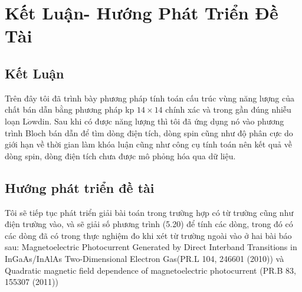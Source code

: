 \chapter{Kết Luận- Hướng Phát Triển Đề Tài}
\label{Chapter0} %
\section{Kết Luận}
Trên đây tôi đã trình bày phương pháp tính toán cấu trúc vùng năng lượng của chất bán dẫn bằng phương pháp kp $14\times14$ chính xác và trong gần đúng nhiễu loạn L$\ddot{o}$wdin.
Sau khi có được năng lượng thì tôi đã ứng dụng nó vào phương trình Bloch bán dẫn để tìm dòng điện tích, dòng spin cũng như độ phân cực do giới hạn về thời gian làm khóa luận cũng như công cụ tính toán nên kết quả về dòng spin, dòng điện tích chưa được mô phỏng hóa qua dữ liệu.
\section{Hướng phát triển đề tài}
Tôi sẽ tiếp tục phát triển giải bài toán trong trường hợp có từ trường cũng như điện trường vào, và sẽ giải số phương trình (5.20) để tính các dòng, trong đó có các dòng đã có trong thực nghiệm đo khi xét từ trường ngoài vào ở hai bài báo sau: Magnetoelectric Photocurrent Generated by Direct Interband Transitions in InGaAs/InAlAs Two-Dimensional Electron Gas(PR.L 104, 246601 (2010)) và
Quadratic magnetic field dependence of magnetoelectric photocurrent (PR.B 83, 155307 (2011))

